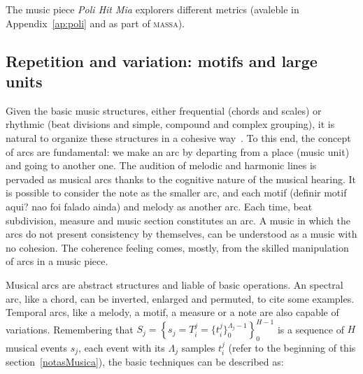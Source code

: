 \documentclass[
 aip,
 jmp,
 amsmath,amssymb,
 reprint,
]{revtex4-1}
\newcommand{\massa}{{\large \textsc{massa}}}
\begin{document}
The music piece \emph{Poli Hit Mia} explorers different metrics (avaleble in Appendix~\ref{ap:poli} and as part of \massa).


\subsection{Repetition and variation: motifs and large units}\label{subsec:motivos}

Given the basic music structures, either frequential (chords and scales) or
rhythmic (beat divisions and simple, compound and complex grouping), it is
natural to organize these structures in a cohesive way~\cite{Boulez}. To this end,
the concept of arcs are fundamental: we make an arc by departing from a place (music unit) and going to another one. The audition of melodic and harmonic lines is pervaded as
musical arcs thanks to the cognitive nature of the musical hearing. It is
possible to consider the note as the smaller arc, and each motif (definir motif aqui? nao foi falado ainda) and melody as another arc. Each time, beat subdivision, measure and music
section constitutes an arc. A music in which the arcs do not present consistency by
themselves, can be understood as a music with no cohesion. The coherence feeling
comes, mostly, from the skilled manipulation of arcs in a music piece.

Musical arcs are abstract structures and liable of basic operations. An spectral
arc, like a chord, can be inverted, enlarged and permuted, to cite some
examples. Temporal arcs, like a melody, a motif, a measure or a note are also
capable of variations. Remembering that
$S_j=\left\{s_j=T_i^j=\{t_i^{j}\}_0^{\Lambda_j-1}\right\}_0^{H-1}$ is a sequence
of $H$ musical events $s_j$, each event with its $\Lambda_j$ samples $t_i^j$
(refer to the beginning of this section~\ref{notasMusica}), the basic techniques
can be described as:
\end{document}
